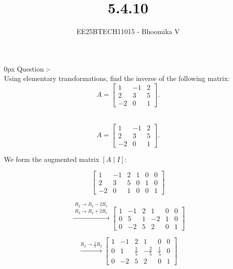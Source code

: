 \documentclass[journal]{IEEEtran}
\begin{document}

\vspace{3cm}

\title{5.4.10}
\author{EE25BTECH11015 - Bhoomika V}
{\let\newpage\relax\maketitle}

\renewcommand{\thefigure}{\theenumi}
\renewcommand{\thetable}{\theenumi}
\setlength{\intextsep}{10pt} %


\renewcommand{\thetable}{\theenumi}
\parindent 0px 
{Question :-} \\ 
Using elementary transformations, find the inverse of the following matrix:
\[
A = \begin{bmatrix}
1 & -1 & 2 \\
2 & 3 & 5 \\
-2 & 0 & 1
\end{bmatrix}.
\]

\solution \\
\[
A = \begin{bmatrix}
1 & -1 & 2 \\
2 & 3 & 5 \\
-2 & 0 & 1
\end{bmatrix}.
\]

We form the augmented matrix $[A \mid I]$:

\[
\left[\begin{array}{ccc|ccc}
1 & -1 & 2 & 1 & 0 & 0\\
2 & 3 & 5 & 0 & 1 & 0\\
-2 & 0 & 1 & 0 & 0 & 1
\end{array}\right]
\]

\[
\overset{\substack{R_2 \to R_2 - 2R_1 \\ R_3 \to R_3 + 2R_1}}{\longrightarrow}
\left[\begin{array}{ccc|ccc}
1 & -1 & 2 & 1 & 0 & 0\\
0 & 5 & 1 & -2 & 1 & 0\\
0 & -2 & 5 & 2 & 0 & 1
\end{array}\right]
\]

\[
\overset{R_2 \to \tfrac{1}{5}R_2}{\longrightarrow}
\left[\begin{array}{ccc|ccc}
1 & -1 & 2 & 1 & 0 & 0\\
0 & 1 & \tfrac{1}{5} & -\tfrac{2}{5} & \tfrac{1}{5} & 0\\
0 & -2 & 5 & 2 & 0 & 1
\end{array}\right]
\]
\end{document}
